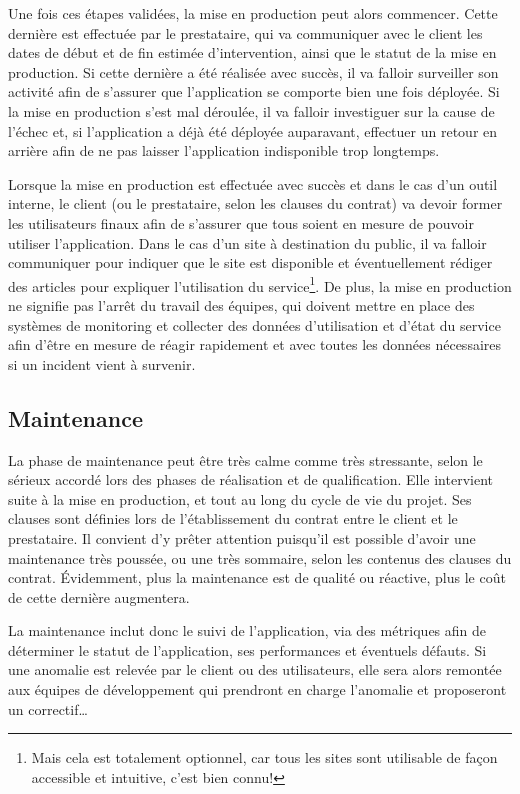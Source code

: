 Une fois ces étapes validées, la mise en production peut alors commencer. Cette dernière est effectuée par le prestataire, qui va communiquer avec le client les dates de début et de fin estimée d'intervention, ainsi que le statut de la mise en production. Si cette dernière a été réalisée avec succès, il va falloir surveiller son activité afin de s'assurer que l'application se comporte bien une fois déployée. Si la mise en production s'est mal déroulée, il va falloir investiguer sur la cause de l'échec et, si l'application a déjà été déployée auparavant, effectuer un retour en arrière afin de ne pas laisser l'application indisponible trop longtemps. 

Lorsque la mise en production est effectuée avec succès et dans le cas d'un outil interne, le client (ou le prestataire, selon les clauses du contrat) va devoir former les utilisateurs finaux afin de s'assurer que tous soient en mesure de pouvoir utiliser l'application. Dans le cas d'un site à destination du public, il va falloir communiquer pour indiquer que le site est disponible et éventuellement rédiger des articles pour expliquer l'utilisation du service\footnote{Mais cela est totalement optionnel, car tous les sites sont utilisable de façon accessible et intuitive, c'est bien connu!}. De plus, la mise en production ne signifie pas l'arrêt du travail des équipes, qui doivent mettre en place des systèmes de monitoring et collecter des données d'utilisation et d'état du service afin d'être en mesure de réagir rapidement et avec toutes les données nécessaires si un incident vient à survenir.

\subsection{Maintenance}

La phase de maintenance peut être très calme comme très stressante, selon le sérieux accordé lors des phases de réalisation et de qualification. Elle intervient suite à la mise en production, et tout au long du cycle de vie du projet. Ses clauses sont définies lors de l'établissement du contrat entre le client et le prestataire. Il convient d'y prêter attention puisqu'il est possible d'avoir une maintenance très poussée, ou une très sommaire, selon les contenus des clauses du contrat. Évidemment, plus la maintenance est de qualité ou réactive, plus le coût de cette dernière augmentera.

La maintenance inclut donc le suivi de l'application, via des métriques afin de déterminer le statut de l'application, ses performances et éventuels défauts. Si une anomalie est relevée par le client ou des utilisateurs, elle sera alors remontée aux équipes de développement qui prendront en charge l'anomalie et proposeront un correctif\ldots

